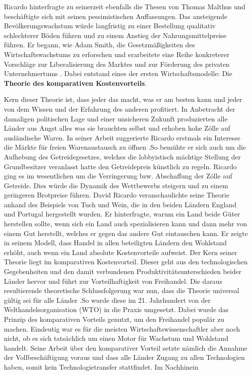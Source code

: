 Ricardo hinterfragte zu seinerzeit ebenfalls die Thesen von Thomas Malthus und besch{\"a}ftigte sich mit seinen pessimistischen Auffassungen. Das ansteigende Bev{\"o}lkerungswachstum w{\"u}rde langfristig zu einer Bestellung qualitativ schlechterer B{\"o}den f{\"u}hren und zu einem Anstieg der Nahrungsmittelpreise f{\"u}hren. Er begann, wie Adam Smith, die Gesetzm{\"a}{\ss}igkeiten des Wirtschaftswachstums zu erforschen und erarbeitete eine Reihe konkreterer Vorschl{\"a}ge zur Liberalisierung des Marktes und zur F{\"o}rderung des privaten Unternehmertums \citep{Lin.2007}. Dabei entstand eines der ersten Wirtschaftsmodelle: Die \textbf{Theorie des komparativen Kostenvorteils}.\newline

 Kern dieser Theorie ist, dass jeder das macht, was er am besten kann und jeder von dem Wissen und der Erfahrung des anderen profitiert. In Anbetracht der damaligen politischen Lage und einer unsicheren Zukunft produzierten alle L{\"a}nder aus Angst alles was sie brauchten selbst und erhoben hohe Z{\"o}lle auf ausl{\"a}ndische Waren. In seiner Arbeit suggerierte Ricardo erstmals ein Interesse die M{\"a}rkte f{\"u}r freien Warenaustausch zu {\"o}ffnen \citep{Ricardo.1817}.\newline So bem{\"u}hte er sich auch um die Aufhebung des Getreidegesetzes, welches die lobbyistisch m{\"a}chtige Stellung der Grundbesitzer veranlasst hatte den Getreidepreis k{\"u}nstlich zu regeln. Ricardo ging es im wesentlichen um die Verringerung bzw. Abschaffung der Z{\"o}lle auf Getreide. Dies w{\"u}rde die Dynamik des Wettbewerbs steigern und zu einem geringeren Brotpreise f{\"u}hren. \newline David Ricardo veranschaulichte seine Theorie anhand des Beispiels von Tuch und Wein, die in den beiden L{\"a}ndern England und Portugal hergestellt wurden. Er hinterfragte, warum ein Land beide G{\"u}ter herstellen sollte, wenn sich ein Land auch spezialisieren kann und dann mehr von einem Gut herstellt, welches er gegen das andere Gut eintauschen kann. Er zeigte in seinem Modell, dass Handel in allen beteiligten L{\"a}ndern den Wohlstand erh{\"o}ht, auch wenn ein Land absolute Kostenvorteile aufweist. Der Kern seiner Theorie liegt im komparativen Kostenvorteil. Dieser geht aus den technologischen Gegebenheiten und den damit verbundenen Produktivit{\"a}tsunterschieden beider L{\"a}nder hervor und f{\"u}hrt zur Vorteilhaftigkeit von Freihandel. Die daraus resultierende theoretische Schlussfolgerung war nun, dass die Theorie universal g{\"u}ltig sei f{\"u}r alle L{\"a}nder \citep{Ricardo.1817}.\newline So wurde diese im 21. Jahrhundert von der Welthandelsorganisation (WTO) in die Praxis umgesetzt. Dabei wurde das Prinzip des komparativen Vorteils genutzt, um den Freihandel popul{\"a}r zu machen. Eindeutig war es für die meisten Wirtschaftswissenschaftler aber noch nicht, ob es sich tats{\"a}chlich um einen Motor f{\"u}r Wachstum und Wohlstand handelt. Seine Arbeit {\"u}ber den komparativer Vorteil setzte nämlich die Annahme der Vollbesch{\"a}ftigung voraus und dass alle L{\"a}nder Zugang zu allen Technologien haben, somit kein Technologietransfer stattfindet. \newline Im Nachhinein  